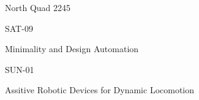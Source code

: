 \documentclass{article}
\begin{document}
\rssheader[1in]

\fontsize{32pt}{36pt}
\selectfont
\begin{center}
North Quad 2245
\end{center}

\vfill

\fontsize{48pt}{56pt}
\selectfont
\begin{center}
SAT-09
\end{center}

\fontsize{24pt}{28pt}
\selectfont
\begin{center}
Minimality and Design Automation
\end{center}

\vfill

\fontsize{48pt}{56pt}
\selectfont
\begin{center}
SUN-01
\end{center}

\fontsize{24pt}{24pt}
\selectfont
\begin{center}
Assitive Robotic Devices for Dynamic Locomotion
\end{center}

\vfill
\end{document}
